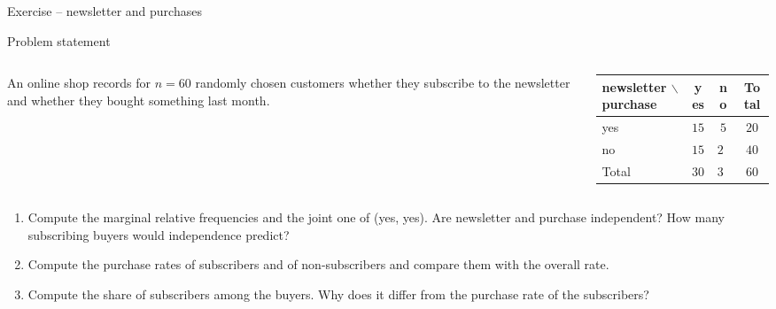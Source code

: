 \documentclass[aspectratio=169,11pt]{beamer}
\begin{document}
\begin{frame}{Exercise -- newsletter and purchases}
  \begin{block}{Problem statement}
    \begin{columns}[c]
      \begin{column}{0.5\textwidth}
        An online shop records for $n=60$ randomly chosen customers whether
        they subscribe to the newsletter and whether they bought something
        last month.
      \end{column}
      \begin{column}{0.46\textwidth}
        \centering
        \renewcommand{\arraystretch}{1.0}
        \begin{tabular}{@{}l|cc|c@{}}
          \toprule
          newsletter $\backslash$ purchase & yes & no & Total\\
          \midrule
          yes & $15$ & $5$ & $20$\\
          no & $15$ & $25$ & $40$\\
          \midrule
          Total & $30$ & $30$ & $60$\\
          \bottomrule
        \end{tabular}
      \end{column}
    \end{columns}
    \begin{enumerate}
      \item Compute the marginal relative frequencies and the joint one of
            (yes, yes). Are newsletter and purchase independent? How many
            subscribing buyers would independence predict?
      \item Compute the purchase rates of subscribers and of
            non-subscribers and compare them with the overall rate.
      \item Compute the share of subscribers among the buyers. Why does it
            differ from the purchase rate of the subscribers?
    \end{enumerate}
  \end{block}
\end{frame}
\end{document}
